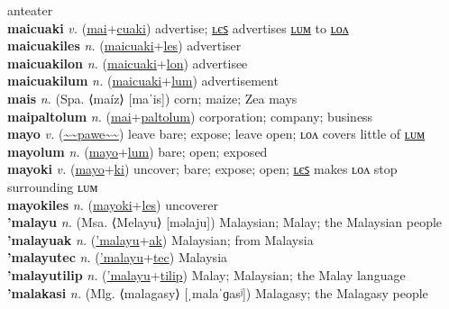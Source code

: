 anteater \label{maihnyamamamul} \\
\textbf{maicuaki} \textit{v.} (\hyperref[mai]{mai}+\hyperref[cuaki]{cuaki})
advertise; \hyperref[maicuakiles]{ʟєꜱ} advertises \hyperref[maicuakilum]{ʟᴜᴍ} to \hyperref[maicuakilon]{ʟᴏᴧ} \label{maicuaki} \\
\textbf{maicuakiles} \textit{n.} (\hyperref[maicuaki]{maicuaki}+\hyperref[les]{les})
advertiser \label{maicuakiles} \\
\textbf{maicuakilon} \textit{n.} (\hyperref[maicuaki]{maicuaki}+\hyperref[lon]{lon})
advertisee \label{maicuakilon} \\
\textbf{maicuakilum} \textit{n.} (\hyperref[maicuaki]{maicuaki}+\hyperref[lum]{lum})
advertisement \label{maicuakilum} \\
\textbf{mais} \textit{n.} (Spa. ⟨maíz⟩ [maˈis])
corn; maize; Zea mays \label{mais} \\
\textbf{maipaltolum} \textit{n.} (\hyperref[mai]{mai}+\hyperref[paltolum]{paltolum})
corporation; company; business \label{maipaltolum} \\
\textbf{mayo} \textit{v.} (\hyperref[pawe]{\~{}\~{}pawe\~{}\~{}})
leave bare; expose; leave open; ʟᴏᴧ covers little of \hyperref[mayolum]{ʟᴜᴍ} \label{mayo} \\
\textbf{mayolum} \textit{n.} (\hyperref[mayo]{mayo}+\hyperref[lum]{lum})
bare; open; exposed \label{mayolum} \\
\textbf{mayoki} \textit{v.} (\hyperref[mayo]{mayo}+\hyperref[ki]{ki})
uncover; bare; expose; open; \hyperref[mayokiles]{ʟєꜱ} makes ʟᴏᴧ stop surrounding ʟᴜᴍ \label{mayoki} \\
\textbf{mayokiles} \textit{n.} (\hyperref[mayoki]{mayoki}+\hyperref[les]{les})
uncoverer \label{mayokiles} \\
\textbf{'malayu} \textit{n.} (Msa. ⟨Melayu⟩ [məlaju])
Malaysian; Malay; the Malaysian people \label{'malayu} \\
\textbf{'malayuak} \textit{n.} (\hyperref['malayu]{'malayu}+\hyperref[ak]{ak})
Malaysian; from Malaysia \label{'malayuak} \\
\textbf{'malayutec} \textit{n.} (\hyperref['malayu]{'malayu}+\hyperref[tec]{tec})
Malaysia \label{'malayutec} \\
\textbf{'malayutilip} \textit{n.} (\hyperref['malayu]{'malayu}+\hyperref[tilip]{tilip})
Malay; Malaysian; the Malay language \label{'malayutilip} \\
\textbf{'malakasi} \textit{n.} (Mlg. ⟨malagasy⟩ [ˌmalaˈɡasʲ])
Malagasy; the Malagasy people \label{'malakasi} \\
